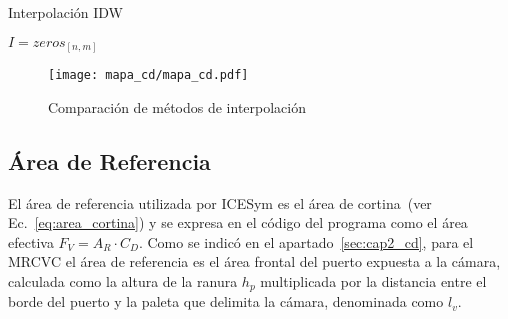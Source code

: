 \begin{algorithm}
    \caption{Interpolación IDW}\label{algo:IDW}


    \BlankLine
    $I=zeros_{[n,m]}$\;
\end{algorithm}



\begin{figure}
    \centering
    \texttt{[image: mapa\_cd/mapa\_cd.pdf]}
    \caption{Comparación de métodos de interpolación}\label{fig:mapas_interpolados}
\end{figure}


\subsection{Área de Referencia}
%
El área de referencia utilizada por ICESym es el área de
cortina~(ver Ec.~\ref{eq:area_cortina}) y se expresa en el código del programa como el
área efectiva $F_{V}=A_{R}\cdot C_{D}$.
%
Como se indicó en el apartado~\ref{sec:cap2_cd}, para el  MRCVC el área de
referencia es el área frontal del puerto expuesta a la cámara, calculada como la
altura de la ranura $h_{p}$ multiplicada por la distancia entre el borde del
puerto y la paleta que delimita la cámara, denominada como $l_{v}$.

